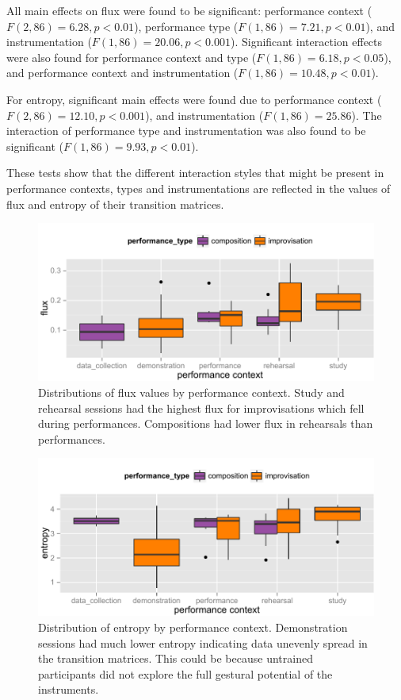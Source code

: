 \documentclass{sigchi}
\begin{document}
All main effects on flux were found to be significant: performance
context ($F(2,86) = 6.28, p < 0.01$), performance type ($F(1,86) =
7.21, p < 0.01$), and instrumentation ($F(1,86) = 20.06, p < 0.001$).
Significant interaction effects were also found for performance
context and type ($F(1,86) = 6.18, p < 0.05$), and performance context and
instrumentation ($F(1,86) = 10.48, p < 0.01$).

For entropy, significant main effects were found due to performance
context ($F(2,86) = 12.10, p < 0.001$), and instrumentation ($F(1,86)
= 25.86$). The interaction of performance type and instrumentation was
also found to be significant ($F(1,86) = 9.93, p<0.01$).

These tests show that the different interaction styles that might be
present in performance contexts, types and
instrumentations are reflected in the values of flux and entropy of
their transition matrices.


\begin{figure}
  \centering
  \includegraphics[width=\linewidth]{figures/flux-boxplot}
  \caption{Distributions of flux values by performance context. Study
    and rehearsal sessions had the highest flux for improvisations
    which fell during performances. Compositions had lower flux in
    rehearsals than performances.
    \label{fig:flux-boxplot}}
\end{figure}

\begin{figure}
  \centering
  \includegraphics[width=\linewidth]{figures/entropy-boxplot}
  \caption{Distribution of entropy by
  performance context. Demonstration sessions had much lower entropy
  indicating data unevenly spread in the transition matrices. This
  could be because untrained
  participants did not explore the full gestural potential of the
  instruments. 
  \label{fig:entropy-boxplot} }
\end{figure}
\end{document}
